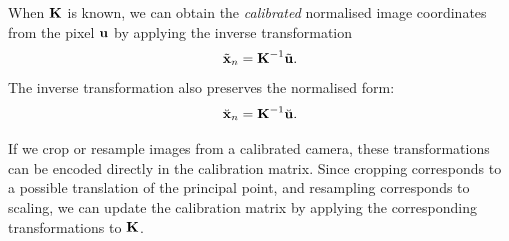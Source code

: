 When ${\boldsymbol{\mathbf{K}}}$ is known, we can obtain the \emph{calibrated} normalised image coordinates from the pixel ${\boldsymbol{\mathbf{u}}}$ by applying the inverse transformation
\begin{equation}
  \tilde{{\boldsymbol{\mathbf{x}}}}_n = {\boldsymbol{\mathbf{K}}}^{-1} \tilde{{\boldsymbol{\mathbf{u}}}}.
\end{equation}
The inverse transformation also preserves the normalised form:
\begin{equation} \label{eq:normalised-from-pixel}
  \breve{{\boldsymbol{\mathbf{x}}}}_n = {\boldsymbol{\mathbf{K}}}^{-1} \breve{{\boldsymbol{\mathbf{u}}}}.
\end{equation}

If we crop or resample images from a calibrated camera, these transformations can be encoded directly in the calibration matrix.
Since cropping corresponds to a possible translation of the principal point, and resampling corresponds to scaling, we can update the calibration matrix by applying the corresponding transformations to ${\boldsymbol{\mathbf{K}}}$.

